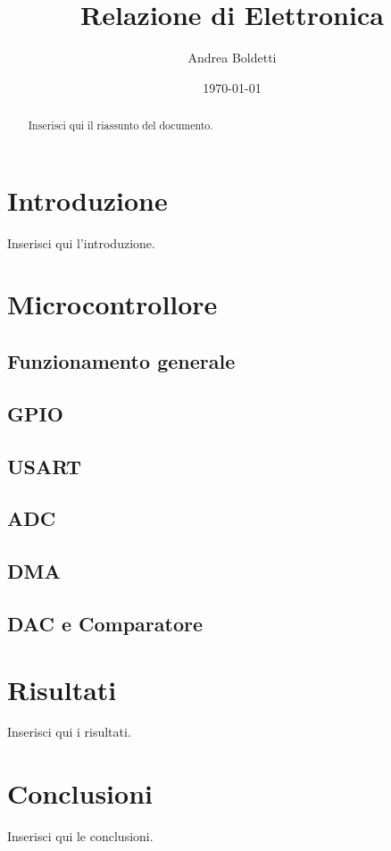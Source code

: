 \documentclass[a4paper,12pt]{article}
\title{Relazione di Elettronica}
\author{Andrea Boldetti}
\date{\today}
\begin{document}
\maketitle

\begin{abstract}
Inserisci qui il riassunto del documento.
\end{abstract}

\newpage
\tableofcontents

\section{Introduzione}
Inserisci qui l'introduzione.

\section{Microcontrollore}
\subsection{Funzionamento generale}

\subsection{GPIO}

\subsection{USART}

\subsection{ADC}

\subsection{DMA}

\subsection{DAC e Comparatore}



\section{Risultati}
Inserisci qui i risultati.

\section{Conclusioni}
Inserisci qui le conclusioni.
\end{document}
